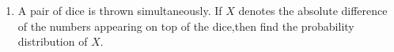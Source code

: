 \begin{enumerate}[label=\thesubsection.\arabic*, ref=\thesubsection.\theenumi]
\begin{align}
\end{align}
Therefore,
\begin{align}
\overrightarrow{CA}\cdot\overrightarrow{CB}
=2+3-5=0.
\end{align}
Since the dot product is zero, the vectors are perpendicular.
\\Hence,
\begin{align}
C=90^\circ
\end{align}
\textbf{Final Answer}\\
\\The three angles of triangle $ABC$ are
\begin{align}
A&=\cos^{-1}\sqrt{\frac{35}{41}},\\[4pt]
B&=\cos^{-1}\sqrt{\frac{6}{41}},\\[4pt]
C&=90^\circ.
\end{align}

\item
A pair of dice is thrown simultaneously. If $X$ denotes the absolute
difference of the  numbers appearing on top of the dice,then find the
probability distribution of $X$.


\end{enumerate}
